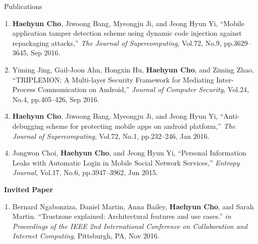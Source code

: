 \documentclass{resume} %
\begin{document}
\begin{rSection}{\faGenderless~Publications}
\begin{enumerate}[leftmargin=0pt]
		\item \textbf{Haehyun Cho}, Jiwoong Bang, Myeongju Ji, and Jeong Hyun Yi, 
		``Mobile application tamper detection scheme using dynamic code injection against repackaging attacks,'' 
		\emph{The Journal of Supercomputing}, 
		Vol.72, No.9, pp.3629--3645, Sep 2016.

		\item Yiming Jing, Gail-Joon Ahn, Hongxin Hu, \textbf{Haehyun Cho}, and Ziming Zhao,
		``TRIPLEMON: A Multi-layer Security Framework for Mediating Inter-Process Communication on Android,'' 
		\emph{Journal of Computer Security}, 
		Vol.24, No.4, pp.405--426, Sep 2016.

		\item \textbf{Haehyun Cho}, Jiwoong Bang, Myeongju Ji, and Jeong Hyun Yi, 
		``Anti-debugging scheme for protecting mobile apps on android platform,'' 
		\emph{The Journal of Supercomputing}, 
		Vol.72, No.1, pp.232--246, Jan 2016.

		\item Jongwon Choi, \textbf{Haehyun Cho}, and Jeong Hyun Yi, 
		``Personal Information Leaks with Automatic Login in Mobile Social Network Services,'' 
		\emph{Entropy Journal}, 
		Vol.17, No.6, pp.3947--3962, Jun 2015.
	\end{enumerate}

    \vspace{3mm}
   
    \strut\textbullet~{\bf Invited Paper}
    \begin{enumerate}[leftmargin=0pt]
        \item Bernard Ngabonziza, Daniel Martin, Anna Bailey, \textbf{Haehyun Cho}, and Sarah Martin.
        ``Trustzone explained: Architectural features and use cases.''
        \emph{in Proceedings of the IEEE 2nd International Conference on Collaboration and Internet Computing}, 
        Pittsburgh, PA, Nov 2016.    
    \end{enumerate}

	\vspace{3mm}
\end{rSection}
\end{document}
